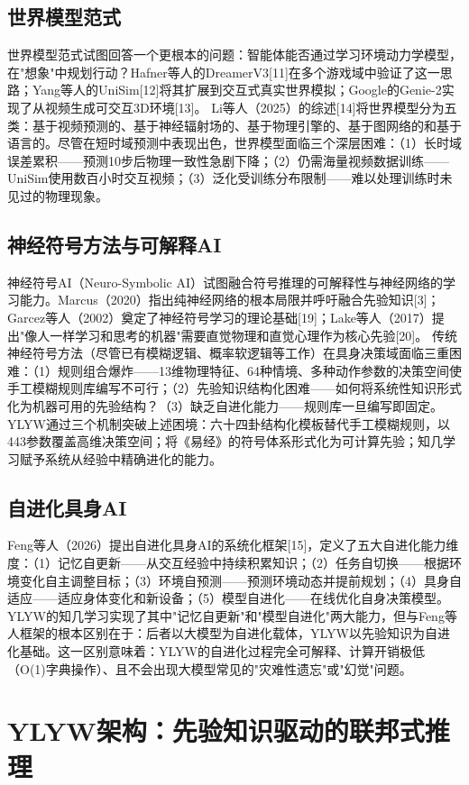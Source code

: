 \documentclass[12pt,a4paper]{article}
\begin{document}
\subsection{世界模型范式}
世界模型范式试图回答一个更根本的问题：智能体能否通过学习环境动力学模型，在"想象"中规划行动？Hafner等人的DreamerV3[11]在多个游戏域中验证了这一思路；Yang等人的UniSim[12]将其扩展到交互式真实世界模拟；Google的Genie-2实现了从视频生成可交互3D环境[13]。
Li等人（2025）的综述[14]将世界模型分为五类：基于视频预测的、基于神经辐射场的、基于物理引擎的、基于图网络的和基于语言的。尽管在短时域预测中表现出色，世界模型面临三个深层困难：（1）长时域误差累积——预测10步后物理一致性急剧下降；（2）仍需海量视频数据训练——UniSim使用数百小时交互视频；（3）泛化受训练分布限制——难以处理训练时未见过的物理现象。

\subsection{神经符号方法与可解释AI}
神经符号AI（Neuro-Symbolic AI）试图融合符号推理的可解释性与神经网络的学习能力。Marcus（2020）指出纯神经网络的根本局限并呼吁融合先验知识[3]；Garcez等人（2002）奠定了神经符号学习的理论基础[19]；Lake等人（2017）提出"像人一样学习和思考的机器"需要直觉物理和直觉心理作为核心先验[20]。
传统神经符号方法（尽管已有模糊逻辑、概率软逻辑等工作）在具身决策域面临三重困难：（1）规则组合爆炸——13维物理特征、64种情境、多种动作参数的决策空间使手工模糊规则库编写不可行；（2）先验知识结构化困难——如何将系统性知识形式化为机器可用的先验结构？（3）缺乏自进化能力——规则库一旦编写即固定。
YLYW通过三个机制突破上述困境：六十四卦结构化模板替代手工模糊规则，以443参数覆盖高维决策空间；将《易经》的符号体系形式化为可计算先验；知几学习赋予系统从经验中精确进化的能力。

\subsection{自进化具身AI}
Feng等人（2026）提出自进化具身AI的系统化框架[15]，定义了五大自进化能力维度：（1）记忆自更新——从交互经验中持续积累知识；（2）任务自切换——根据环境变化自主调整目标；（3）环境自预测——预测环境动态并提前规划；（4）具身自适应——适应身体变化和新设备；（5）模型自进化——在线优化自身决策模型。
YLYW的知几学习实现了其中"记忆自更新"和"模型自进化"两大能力，但与Feng等人框架的根本区别在于：后者以大模型为自进化载体，YLYW以先验知识为自进化基础。这一区别意味着：YLYW的自进化过程完全可解释、计算开销极低（O(1)字典操作）、且不会出现大模型常见的"灾难性遗忘"或"幻觉"问题。

\section{YLYW架构：先验知识驱动的联邦式推理}
\end{document}
